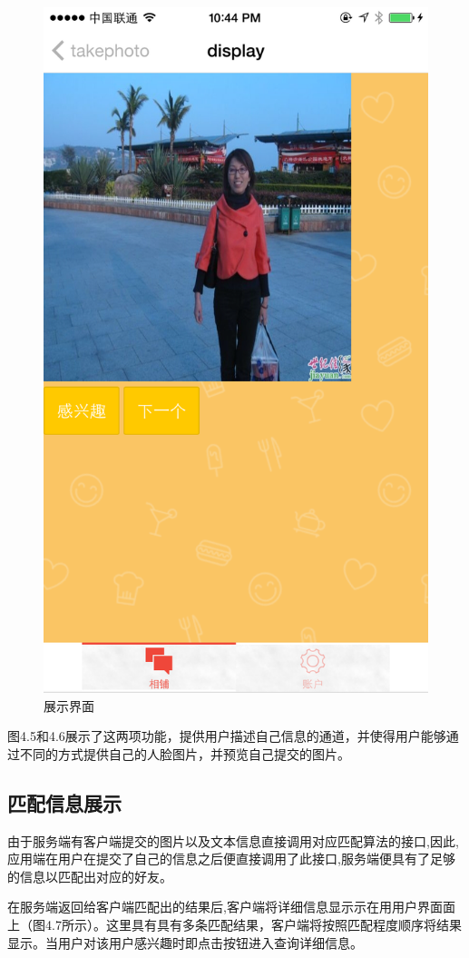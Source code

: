 \begin{figure}[h]
\begin{minipage}[t]{0.3\linewidth}
\includegraphics[width=\textwidth]{img/chap4/display.PNG}
\caption{展示界面\label{instagram}}
\end{minipage}



\end{figure}
图4.5和4.6展示了这两项功能，提供用户描述自己信息的通道，并使得用户能够通过不同的方式提供自己的人脸图片，并预览自己提交的图片。
\subsection{匹配信息展⽰}
由于服务端有客户端提交的图片以及文本信息直接调用对应匹配算法的接口,因此,应用端在用户在提交了自己的信息之后便直接调用了此接口,服务端便具有了足够的信息以匹配出对应的好友。

在服务端返回给客户端匹配出的结果后,客户端将详细信息显⽰示在⽤用户界⾯面上（图4.7所示）。这里具有具有多条匹配结果，客户端将按照匹配程度顺序将结果显⽰。当用户对该用户感兴趣时即点击按钮进入查询详细信息。




